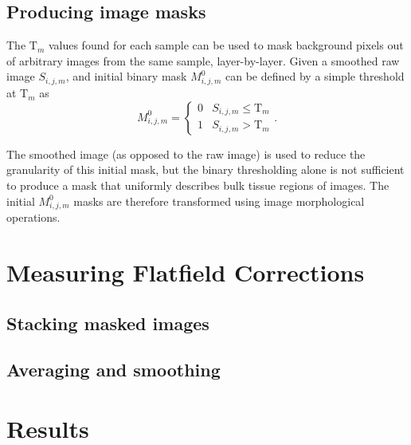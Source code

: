 \documentclass[letterpaper,11pt]{article}
\newcommand{\Tau}{\mathrm{T}}
\begin{document}
\subsection{Producing image masks}
\label{ssec:producing_image_masks}

The $\Tau_{m}$ values found for each sample can be used to mask background pixels out of arbitrary images from the same sample, layer-by-layer. Given a smoothed raw image $S_{i,j,m}$, and initial binary mask $M^{0}_{i,j,m}$ can be defined by a simple threshold at $\Tau_{m}$ as
\begin{equation}
M^{0}_{i,j,m} = 
\begin{cases} 
      0 & S_{i,j,m} \leq \Tau_{m} \\
      1 & S_{i,j,m} > \Tau_{m} 
\end{cases}
 .
\end{equation}

The smoothed image (as opposed to the raw image) is used to reduce the granularity of this initial mask, but the binary thresholding alone is not sufficient to produce a mask that uniformly describes bulk tissue regions of images. The initial $M^{0}_{i,j,m}$ masks are therefore transformed using image morphological operations.

\section{Measuring Flatfield Corrections}
\label{sec:measuring_flatfield_corrections}

\subsection{Stacking masked images}
\label{ssec:stacking_masked_images}

\subsection{Averaging and smoothing}
\label{ssec:averaging_and_smoothing}

\section{Results}
\label{sec:results}
\end{document}

